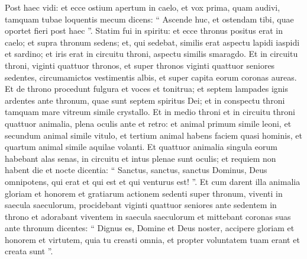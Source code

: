 \begin{biblechapter}
\begin{biblechapter}
\begin{biblechapter}
\begin{biblechapter}
\verse Post haec vidi: et ecce ostium apertum in caelo, et vox prima, quam audivi, tamquam tubae loquentis mecum dicens: “ Ascende huc, et ostendam tibi, quae oportet fieri post haec ”. 
\verse Statim fui in spiritu: et ecce thronus positus erat in caelo; et supra thronum sedens; 
\verse et, qui sedebat, similis erat aspectu lapidi iaspidi et sardino; et iris erat in circuitu throni, aspectu similis smaragdo. 
\verse Et in circuitu throni, viginti quattuor thronos, et super thronos viginti quattuor seniores sedentes, circumamictos vestimentis albis, et super capita eorum coronas aureas. 
\verse Et de throno procedunt fulgura et voces et tonitrua; et septem lampades ignis ardentes ante thronum, quae sunt septem spiritus Dei; 
\verse et in conspectu throni tamquam mare vitreum simile crystallo. Et in medio throni et in circuitu throni quattuor animalia, plena oculis ante et retro: 
\verse et animal primum simile leoni, et secundum animal simile vitulo, et tertium animal habens faciem quasi hominis, et quartum animal simile aquilae volanti. 
\verse Et quattuor animalia singula eorum habebant alas senas, in circuitu et intus plenae sunt oculis; et requiem non habent die et nocte dicentia: “ Sanctus, sanctus, sanctus Dominus, Deus omnipotens, qui erat et qui est et qui venturus est! ”. 
\verse Et cum darent illa animalia gloriam et honorem et gratiarum actionem sedenti super thronum, viventi in saecula saeculorum, 
\verse procidebant viginti quattuor seniores ante sedentem in throno et adorabant viventem in saecula saeculorum et mittebant coronas suas ante thronum dicentes:
 \verse “ Dignus es, Domine et Deus noster,
 accipere gloriam et honorem et virtutem,
 quia tu creasti omnia,
 et propter voluntatem tuam erant et creata sunt ”.
 

\end{biblechapter}
\end{biblechapter}
\end{biblechapter}
\end{biblechapter}

